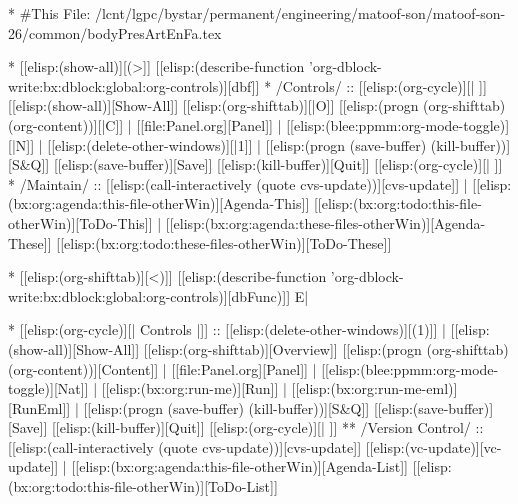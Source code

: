 
\begin{whenOrg}
*  #This File: /lcnt/lgpc/bystar/permanent/engineering/matoof-son/matoof-son-26/common/bodyPresArtEnFa.tex
\end{whenOrg}

\begin{whenOrg}
* [[elisp:(show-all)][(>]] [[elisp:(describe-function 'org-dblock-write:bx:dblock:global:org-controls)][dbf]]
*  /Controls/ ::  [[elisp:(org-cycle)][| ]]  [[elisp:(show-all)][Show-All]]  [[elisp:(org-shifttab)][|O]]  [[elisp:(progn (org-shifttab) (org-content))][|C]] | [[file:Panel.org][Panel]] | [[elisp:(blee:ppmm:org-mode-toggle)][|N]] | [[elisp:(delete-other-windows)][|1]] | [[elisp:(progn (save-buffer) (kill-buffer))][S&Q]]  [[elisp:(save-buffer)][Save]]  [[elisp:(kill-buffer)][Quit]] [[elisp:(org-cycle)][| ]]
*  /Maintain/ ::  [[elisp:(call-interactively (quote cvs-update))][cvs-update]] | [[elisp:(bx:org:agenda:this-file-otherWin)][Agenda-This]] [[elisp:(bx:org:todo:this-file-otherWin)][ToDo-This]] | [[elisp:(bx:org:agenda:these-files-otherWin)][Agenda-These]] [[elisp:(bx:org:todo:these-files-otherWin)][ToDo-These]]

* [[elisp:(org-shifttab)][<)]] [[elisp:(describe-function 'org-dblock-write:bx:dblock:global:org-controls)][dbFunc)]]  E|
\end{whenOrg}

\begin{whenOrg}
* [[elisp:(org-cycle)][| Controls |]] :: [[elisp:(delete-other-windows)][(1)]] | [[elisp:(show-all)][Show-All]]  [[elisp:(org-shifttab)][Overview]]  [[elisp:(progn (org-shifttab) (org-content))][Content]] | [[file:Panel.org][Panel]] | [[elisp:(blee:ppmm:org-mode-toggle)][Nat]] | [[elisp:(bx:org:run-me)][Run]] | [[elisp:(bx:org:run-me-eml)][RunEml]] | [[elisp:(progn (save-buffer) (kill-buffer))][S&Q]]  [[elisp:(save-buffer)][Save]]  [[elisp:(kill-buffer)][Quit]] [[elisp:(org-cycle)][| ]]
** /Version Control/ ::  [[elisp:(call-interactively (quote cvs-update))][cvs-update]]  [[elisp:(vc-update)][vc-update]] | [[elisp:(bx:org:agenda:this-file-otherWin)][Agenda-List]]  [[elisp:(bx:org:todo:this-file-otherWin)][ToDo-List]]
\end{whenOrg}

